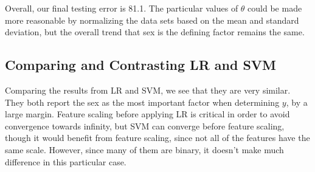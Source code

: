 \documentclass[10pt,letterpaper]{article}
\begin{document}
Overall, our final testing error is 81.1. The particular values of $\theta$ could be made more reasonable by normalizing the data sets based on the mean and standard deviation, but the overall trend that sex is the defining factor remains the same.

\subsection{Comparing and Contrasting LR and SVM}
Comparing the results from LR and SVM, we see that they are very similar. They both report the sex as the most important factor when determining $y$, by a large margin. Feature scaling before applying LR is critical in order to avoid convergence towards infinity, but SVM can converge before feature scaling, though it would benefit from feature scaling, since not all of the features have the same scale. However, since many of them are binary, it doesn't make much difference in this particular case.
\end{document}

